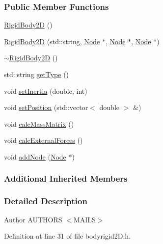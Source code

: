 \subsubsection*{Public Member Functions}
\begin{DoxyCompactItemize}
\item 
\hyperlink{classmknix_1_1_rigid_body2_d_a4689e5f861400337980478a2d8845834}{Rigid\+Body2\+D} ()
\item 
\hyperlink{classmknix_1_1_rigid_body2_d_ae8506521fc62c80097857eccaffaa1db}{Rigid\+Body2\+D} (std\+::string, \hyperlink{classmknix_1_1_node}{Node} $\ast$, \hyperlink{classmknix_1_1_node}{Node} $\ast$, \hyperlink{classmknix_1_1_node}{Node} $\ast$)
\item 
\hyperlink{classmknix_1_1_rigid_body2_d_a38d39e70ab2af08776a426fec5dc8f36}{$\sim$\+Rigid\+Body2\+D} ()
\item 
std\+::string \hyperlink{classmknix_1_1_rigid_body2_d_a36d7142c5123c4055c019109fb6169dc}{get\+Type} ()
\item 
void \hyperlink{classmknix_1_1_rigid_body2_d_a82c95b95d891532a73ec8dedc281aec4}{set\+Inertia} (double, int)
\item 
void \hyperlink{classmknix_1_1_rigid_body2_d_a485001c8c9639f1be3afebd185b3b921}{set\+Position} (std\+::vector$<$ double $>$ \&)
\item 
void \hyperlink{classmknix_1_1_rigid_body2_d_a9ee8593743364a723107d307c12d8ad1}{calc\+Mass\+Matrix} ()
\item 
void \hyperlink{classmknix_1_1_rigid_body2_d_a2d1b7d48c98c3e0ef63dc2c975637793}{calc\+External\+Forces} ()
\item 
void \hyperlink{classmknix_1_1_rigid_body2_d_a62a44eed6a60518564005506cefc7595}{add\+Node} (\hyperlink{classmknix_1_1_node}{Node} $\ast$)
\end{DoxyCompactItemize}
\subsubsection*{Additional Inherited Members}


\subsubsection{Detailed Description}
\begin{DoxyAuthor}{Author}
A\+U\+T\+H\+O\+R\+S $<$\+M\+A\+I\+L\+S$>$ 
\end{DoxyAuthor}


Definition at line 31 of file bodyrigid2\+D.\+h.



